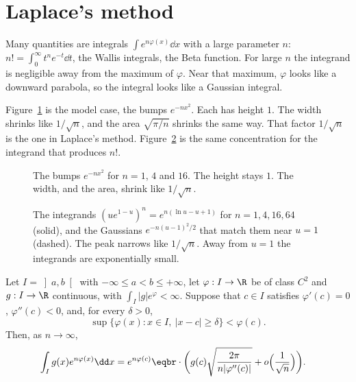 \section{Laplace's method}

Many quantities are integrals $\int e^{n\varphi(x)}\dd x$ with a large parameter $n$: $n!=\int_0^\infty t^ne^{-t}\dd t$, the Wallis integrals, the Beta function. For large $n$ the integrand is negligible away from the maximum of $\varphi$. Near that maximum, $\varphi$ looks like a downward parabola, so the integral looks like a Gaussian integral.

Figure~\ref{fig:rw11-bump} is the model case, the bumps $e^{-n x^2}$. Each has height $1$. The width shrinks like $1/\sqrt n$, and the area $\sqrt{\pi/n}$ shrinks the same way. That factor $1/\sqrt n$ is the one in Laplace's method. Figure~\ref{fig:laplace} is the same concentration for the integrand that produces $n!$.

\begin{figure}[ht]
\centering
{}
\caption{The bumps $e^{-nx^2}$ for $n=1$, $4$ and $16$. The height stays $1$. The width, and the area, shrink like $1/\sqrt n$.}
\label{fig:rw11-bump}
\end{figure}

\begin{figure}[ht]
\centering
{}
\caption{The integrands $(ue^{1-u})^n=e^{n(\ln u-u+1)}$ for $n=1,4,16,64$ (solid), and the Gaussians $e^{-n(u-1)^2/2}$ that match them near $u=1$ (dashed). The peak narrows like $1/\sqrt n$. Away from $u=1$ the integrands are exponentially small.}
\label{fig:laplace}
\end{figure}

\begin{theorem}\label{thm:laplace}
Let $I=\left]a,b\right[$ with $-\infty\le a<b\le+\infty$, let $\varphi:I\to\R$ be of class $C^2$ and $g:I\to\R$ continuous, with $\int_I|g|e^\varphi<\infty$.
Suppose that $c\in I$ satisfies $\varphi'(c)=0$, $\varphi''(c)<0$, and, for every $\delta>0$,
\[
\sup\bigl\{\varphi(x):x\in I,\ |x-c|\ge\delta\bigr\}<\varphi(c).
\]
Then, as $n\to\infty$,
\[
\begin{aligned}\int_Ig(x)e^{n\varphi(x)}\dd x&=e^{n\varphi(c)}\eqbr\cdot\biggl(g(c)\sqrt{\frac{2\pi}{n|\varphi''(c)|}}+o\Bigl(\frac1{\sqrt n}\Bigr)\biggr).\end{aligned}
\]
\end{theorem}

